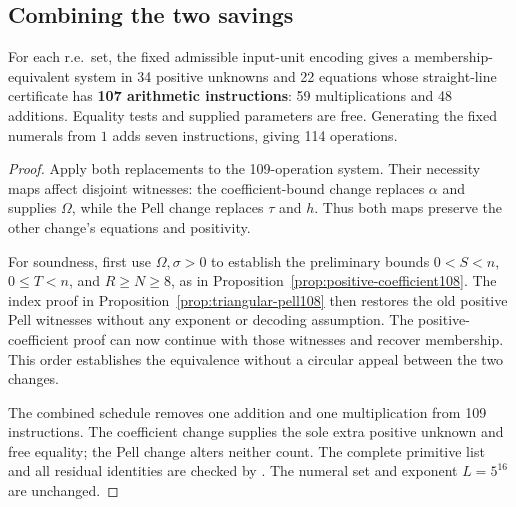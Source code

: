 \subsection{Combining the two savings}

\begin{theorem}\label{thm:best107}
For each r.e.\ set, the fixed admissible input-unit encoding gives
a membership-equivalent system in 34 positive unknowns and 22 equations
whose straight-line certificate has \textbf{107 arithmetic instructions}:
59 multiplications and 48 additions. Equality tests and supplied
parameters are free. Generating the fixed numerals from $1$ adds
seven instructions, giving 114 operations.
\end{theorem}
\begin{proof}
Apply both replacements to the 109-operation system. Their
necessity maps affect disjoint witnesses: the coefficient-bound
change replaces $\alpha$ and supplies $\Omega$, while the Pell
change replaces $\tau$ and $h$. Thus both maps preserve the
other change's equations and positivity.

For soundness, first use $\Omega,\sigma>0$ to establish the
preliminary bounds $0<S<n$, $0\le T<n$, and $R\ge N\ge8$,
as in Proposition~\ref{prop:positive-coefficient108}.
The index proof in Proposition~\ref{prop:triangular-pell108}
then restores the old positive Pell witnesses without any exponent
or decoding assumption. The positive-coefficient proof can now
continue with those witnesses and recover membership. This order
establishes the equivalence without a circular appeal between the
two changes.

The combined schedule removes one addition and one multiplication
from 109 instructions. The coefficient change supplies the sole
extra positive unknown and free equality; the Pell change alters
neither count. The complete primitive list and all residual
identities are checked by .
The numeral set and exponent $L=5^{16}$ are unchanged.
\end{proof}
